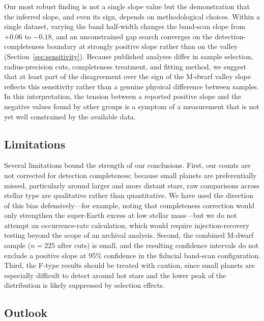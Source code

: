 \documentclass[twocolumn]{aastex701}
\begin{document}
Our most robust finding is not a single slope value but the demonstration that
the inferred slope, and even its sign, depends on methodological choices.
Within a single dataset, varying the band half-width changes the band-scan
slope from $+0.06$ to $-0.18$, and an unconstrained gap search converges on the
detection-completeness boundary at strongly positive slope rather than on the
valley (Section~\ref{sec:sensitivity}). Because published analyses differ in
sample selection, radius-precision cuts, completeness treatment, and fitting
method, we suggest that at least part of the disagreement over the sign of the
M-dwarf valley slope reflects this sensitivity rather than a genuine physical
difference between samples. In this interpretation, the tension between a
reported positive slope and the negative values found by other groups is a
symptom of a measurement that is not yet well constrained by the available
data.

\subsection{Limitations}
\label{sec:limits}

Several limitations bound the strength of our conclusions. First, our counts
are not corrected for detection completeness; because small planets are
preferentially missed, particularly around larger and more distant stars, raw
comparisons across stellar type are qualitative rather than quantitative. We
have used the direction of this bias defensively---for example, noting that
completeness correction would only strengthen the super-Earth excess at low
stellar mass---but we do not attempt an occurrence-rate calculation, which
would require injection-recovery testing beyond the scope of an archival
analysis. Second, the combined M-dwarf sample ($n = 225$ after cuts) is small,
and the resulting confidence intervals do not exclude a positive slope at 95\%
confidence in the fiducial band-scan configuration. Third, the F-type results
should be treated with caution, since small planets are especially difficult to
detect around hot stars and the lower peak of the distribution is likely
suppressed by selection effects.

\subsection{Outlook}
\label{sec:outlook}
\end{document}
